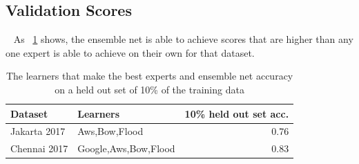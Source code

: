 
\subsection{Validation Scores}~\label{chap4:ensemble_scores}
As \tableautorefname{}~\ref{table:ensemble_short_acc} shows, the ensemble net is
able to achieve scores that are higher than any one expert is able to achieve on
their own for that dataset.
\begin{table}
\centering

\begin{tabular}{llr}
\toprule
      Dataset &              Learners &  10\% held out set acc.\\
\hline
 Jakarta 2017 &         Aws,Bow,Flood &              0.76 \\
\midrule
 Chennai 2017 &  Google,Aws,Bow,Flood &              0.83 \\
\bottomrule
\end{tabular}
\caption{The learners that make the best experts and ensemble net accuracy on a
  held out set of 10\% of the training data}\label{table:ensemble_short_acc}
\end{table}

